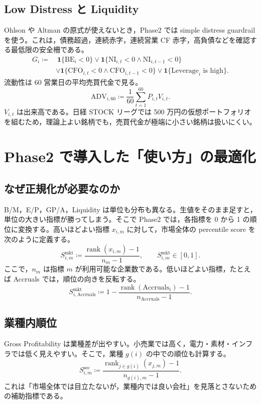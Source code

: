\documentclass[a4paper,10pt]{article}
\newcommand{\metric}[1]{\mathrm{#1}}
\newcommand{\ind}[1]{\mathbf{1}\{#1\}}
\newcommand{\rank}{\operatorname{rank}}
\begin{document}
\subsection{Low Distress と Liquidity}
Ohlson や Altman の原式が使えないとき，Phase2 では simple distress guardrail を使う。これは，債務超過，連続赤字，連続営業 CF 赤字，高負債などを確認する最低限の安全柵である。
\begin{align}
G_i \coloneqq &\ \ind{\metric{BE}_i < 0}
\lor \ind{\metric{NI}_{i,t}<0 \land \metric{NI}_{i,t-1}<0} \\
&\lor \ind{\metric{CFO}_{i,t}<0 \land \metric{CFO}_{i,t-1}<0}
\lor \ind{\metric{Leverage}_i \text{ is high}} .
\end{align}
流動性は 60 営業日の平均売買代金で見る。
\begin{equation}
\metric{ADV}_{i,60} \coloneqq \frac{1}{60}\sum_{t=1}^{60} P_{i,t} V_{i,t} .
\end{equation}
$V_{i,t}$ は出来高である。日経 STOCK リーグでは 500 万円の仮想ポートフォリオを組むため，理論上よい銘柄でも，売買代金が極端に小さい銘柄は扱いにくい。

\section{Phase2 で導入した「使い方」の最適化}

\subsection{なぜ正規化が必要なのか}
B/M，E/P，GP/A，Liquidity は単位も分布も異なる。生値をそのまま足すと，単位の大きい指標が勝ってしまう。そこで Phase2 では，各指標を 0 から 1 の順位に変換する。高いほどよい指標 $x_{i,m}$ に対して，市場全体の percentile score を次のように定義する。
\begin{equation}
S^{\mathrm{mkt}}_{i,m} \coloneqq \frac{\rank(x_{i,m})-1}{n_m-1}, \qquad S^{\mathrm{mkt}}_{i,m}\in[0,1] .
\end{equation}
ここで，$n_m$ は指標 $m$ が利用可能な企業数である。低いほどよい指標，たとえば Accruals では，順位の向きを反転する。
\begin{equation}
S^{\mathrm{mkt}}_{i,\mathrm{Accruals}} \coloneqq 1-\frac{\rank(\metric{Accruals}_i)-1}{n_{\mathrm{Accruals}}-1} .
\end{equation}

\subsection{業種内順位}
Gross Profitability は業種差が出やすい。小売業では高く，電力・素材・インフラでは低く見えやすい。そこで，業種 $g(i)$ の中での順位も計算する。
\begin{equation}
S^{\mathrm{sec}}_{i,m} \coloneqq \frac{\rank_{j\in g(i)}(x_{j,m})-1}{n_{g(i),m}-1} .
\end{equation}
これは「市場全体では目立たないが，業種内では良い会社」を見落とさないための補助指標である。
\end{document}
